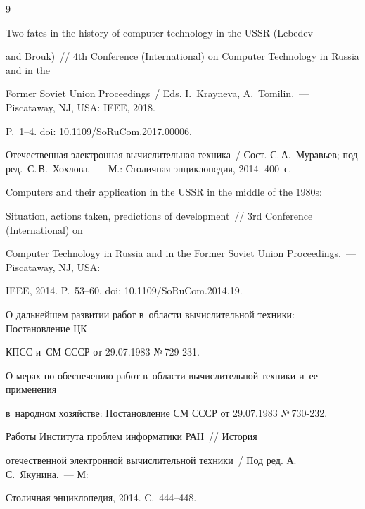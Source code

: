 {\small\frenchspacing

{%


\begin{thebibliography}{9}


   Two fates in the history of computer technology in the USSR (Lebedev 

and Brouk)~/\!\!/ 4th Conference (International) on Computer Technology in Russia and in the 

Former Soviet Union Proceedings~/ Eds. I.~Kray\-ne\-va, A.~To\-mi\-lin.~--- Piscataway, NJ, USA: IEEE, 2018. 

P.~1--4. doi: 10.1109\!/\!SoRuCom.2017.00006.


  Отечественная электронная вы\-чис\-ли\-тель\-ная техника~/ Сост. С.\,А.~Муравьев; под ред.\ С.\,В.~Хохлова.~--- М.: Столичная энциклопедия, 2014. 400~с.


   Computers and their application in the USSR in the middle of the 1980s: 

Situation, actions taken, predictions of development~/\!\!/ 3rd Conference (International) on 

Computer Technology in Russia and in the Former Soviet Union Proceedings.~--- Piscataway, NJ, USA: 

IEEE, 2014. P.~53--60. doi: 10.1109\!/\!SoRuCom.2014.19.


  О дальнейшем развитии работ в~об\-ласти вы\-чис\-ли\-тель\-ной техники: По\-ста\-нов\-ле\-ние ЦК 

\mbox{КПСС} и~СМ \mbox{СССР} от 29.07.1983 №\,729-231.


  О мерах по обеспечению работ в~об\-ласти вы\-чис\-ли\-тель\-ной техники и~ее применения 

в~народном хозяйстве: По\-ста\-нов\-ление СМ \mbox{СССР} от 29.07.1983 №\,730-232.


   Работы Института проб\-лем информатики РАН~/\!\!/ История 

отечественной электронной вы\-чис\-ли\-тель\-ной техники~/ Под ред. А.\,С.~Якунина.~--- М: 

Столичная энциклопедия, 2014. C.~444--448.

   \end{thebibliography}

} }







